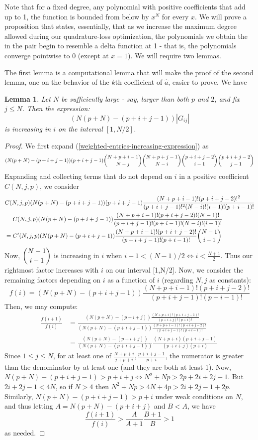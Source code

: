 \documentclass[11pt]{article}
\newtheorem{lem}[thm]{Lemma}
\theoremstyle{definition}
\theoremstyle{remark}
\numberwithin{equation}{section}
\begin{document}
Note that for a fixed degree, any polynomial with positive coefficients that add up to 1, the function is bounded from below by $x^N$ for every $x$. We will prove a proposition that states, essentially, that as we increase the maximum degree allowed during our quadrature-loss optimization, the polynomials we obtain the in the pair begin to resemble a delta function at 1 - that is, the polynomials converge pointwise to 0 (except at $x=1$). We will require two lemmas. 

The first lemma is a computational lemma that will make the proof of the second lemma, one on the behavior of the $k$th coefficient of $\hat{a}$, easier to prove. We have
\begin{lem}\label{computational-inequality-lemma}
Let $N$ be sufficiently large - say, larger than both $p$ and $2$, and fix $j \le N$. Then the expression:
\begin{equation} \label{weighted-entries-increasing-expression}(N(p+N)-(p+i+j-1))|G_{ij}|\end{equation} is increasing in $i$ on the interval $[1,N/2]$.
\end{lem}
\begin{proof}
We first expand (\ref{weighted-entries-increasing-expression}) as
\[(N(p+N)-(p+i+j-1))(p+i+j-1)\dbinom{N+p+i-1}{N-j} \dbinom{N+p+j-1}{N-i} \dbinom{p+i+j-2}{i-1} \dbinom{p+i+j-2}{j-1}\]
Expanding and collecting terms that do not depend on $i$ in a positive coefficient $C(N,j,p)$, we consider 
\begin{align*}
&C(N,j,p)(N(p+N)-(p+i+j-1))(p+i+j-1) \frac{(N+p+i-1)!(p+i+j-2)!^2}{(p+i+j-1)!^2(N-i)!(i-1)!(p+i-1)!}\\
&= C(N,j,p)(N(p+N)-(p+i+j-1))\frac{(N+p+i-1)!(p+i+j-2)!(N-1)!}{(p+i+j-1)!(p+i-1)!(N-i)!(i-1)!}\\
&= C'(N,j,p)(N(p+N)-(p+i+j-1))\frac{(N+p+i-1)!(p+i+j-2)!}{(p+i+j-1)!(p+i-1)!}\dbinom{N-1}{i-1}
\end{align*} Now, $\dbinom{N-1}{i-1}$ is increasing in $i$ when $i-1 < (N-1)/2 \iff i < \frac{N+1}{2}$. Thus our rightmost factor increases with $i$ on our interval [1,N/2]. Now, we consider the remaining factors depending on $i$ as a function of $i$ (regarding $N, j$ as constants):
\[f(i) = (N(p+N)-(p+i+j-1))\frac{(N+p+i-1)!(p+i+j-2)!}{(p+i+j-1)!(p+i-1)!}\]
Then, we may compute:
\begin{align*}
\frac{f(i+1)}{f(i)} &= \frac{(N(p+N)-(p+i+j))\frac{(N+p+i)!(p+i+j-1)!}{(p+i+j)!(p+i)!}}{(N(p+N)-(p+i+j-1))\frac{(N+p+i-1)!(p+i+j-2)!}{(p+i+j-1)!(p+i-1)!}} \\
&= \frac{(N(p+N)-(p+i+j))}{(N(p+N)-(p+i+j-1))} \frac{(N+p+i)(p+i+j-1)}{(p+i+j)(p+i)}\
\end{align*}
Since $1\le j \le N$, for at least one of $\frac{N+p+i}{j+p+i}, \frac{p+i+j-1}{p+i}$, the numerator is greater than the denominator by at least one (and they are both at least 1). Now, $N(p+N)-(p+i+j-1) > p+i+j \iff N^2 +Np>2p+2i+2j-1$. But $2i+2j-1<4N$, so if $N>4$ then $N^2+Np>4N+4p>2i+2j-1+2p$. Similarly, $N(p+N)-(p+i+j-1)>p+i$ under weak conditions on $N$, and thus letting $A=N(p+N)-(p+i+j)$ and $B<A$, we have 
\[\frac{f(i+1)}{f(i)} > \frac{A}{A+1} \frac{B+1}{B} > 1\]
as needed.
\end{proof} 
\end{document}
